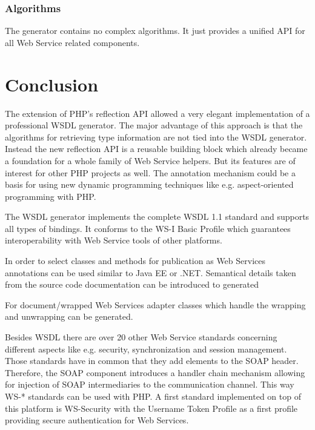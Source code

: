 \documentclass[10pt,final,a4paper,oneside]{article}
\begin{document}

\subsubsection{Algorithms}
The generator contains no complex algorithms.
It just provides a unified API
for all Web Service related components.





\section{Conclusion}
The extension of PHP's reflection API allowed a very elegant 
implementation of a professional WSDL generator. The major advantage of 
this approach is that the algorithms for retrieving type information are 
not tied into the WSDL generator. Instead the new reflection API is a 
reusable building block which already became a foundation for a whole 
family of Web Service helpers. But its features are of interest for 
other PHP projects as well. The annotation mechanism could be a basis 
for using new dynamic programming techniques like e.g. aspect-oriented 
programming with PHP. 

The WSDL generator implements the complete WSDL 1.1 standard and 
supports all types of bindings. It conforms to the WS-I Basic Profile 
which guarantees interoperability with Web Service tools of other 
platforms. 

In order to select classes and methods for publication as Web Services 
annotations can be used similar to Java EE or .NET. Semantical details 
taken from the source code documentation can be introduced to generated 

For document/wrapped Web Services adapter classes which handle the 
wrapping and unwrapping can be generated. 

Besides WSDL there are over 20 other Web Service standards concerning 
different aspects like e.g. security, synchronization and session management. 
Those standards have in common that they add elements to the SOAP 
header. Therefore, the SOAP component introduces a handler chain 
mechanism allowing for injection of SOAP intermediaries to the 
communication channel. This way WS-* standards can be used with PHP. A 
first standard implemented on top of this platform is WS-Security with 
the Username Token Profile as a first profile providing secure 
authentication for Web Services. 
\end{document}
